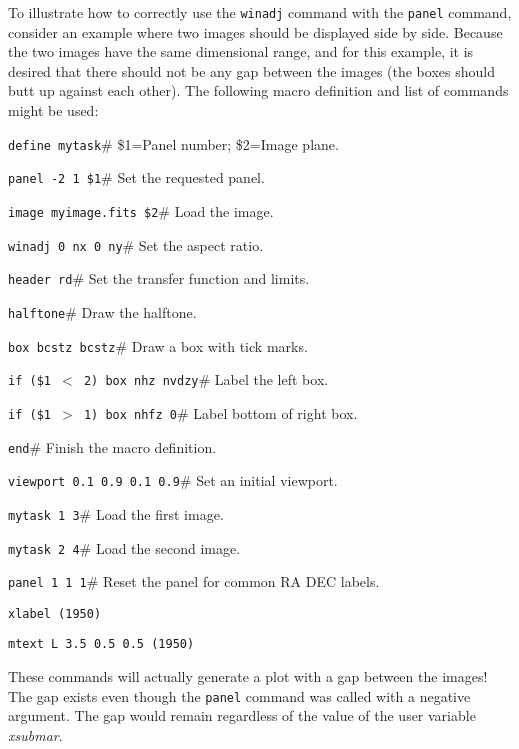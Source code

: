 To illustrate how to correctly use the {\tt winadj} command with the
{\tt panel} command,
consider an example where two images should be displayed side by side.
Because the two images have the same dimensional range,
and for this example, it is desired that
there should not be any gap between the images (\ie the boxes should
butt up against each other).
The following macro definition and list of commands might be used:
\begin{wiplist}%
  \item {\tt define mytask}\hfill \# \$1=Panel number; \$2=Image plane.
\samepage
  \item [\wipd] {\tt panel -2 1 \$1}\hfill \# Set the requested panel.
  \item [\wipd] {\tt image myimage.fits \$2}\hfill \# Load the image.
  \item [\wipd] {\tt winadj 0 nx 0 ny}\hfill \# Set the aspect ratio.
  \item [\wipd] {\tt header rd}\hfill \# Set the transfer function and limits.
  \item [\wipd] {\tt halftone}\hfill \# Draw the halftone.
  \item [\wipd] {\tt box bcstz bcstz}\hfill \# Draw a box with tick marks.
  \item [\wipd] {\tt if (\$1 $<$ 2) box nhz nvdzy}\hfill \# Label the left box.
  \item [\wipd] {\tt if (\$1 $>$ 1) box nhfz 0}\hfill \# Label bottom of right box.
  \item [\wipd] {\tt end}\hfill \# Finish the macro definition.
  \item {\tt viewport 0.1 0.9 0.1 0.9}\hfill \# Set an initial viewport.
  \item {\tt mytask 1 3}\hfill \# Load the first image.
  \item {\tt mytask 2 4}\hfill \# Load the second image.
  \item {\tt panel 1 1 1}\hfill \# Reset the panel for common RA DEC labels.
  \item {\tt xlabel  (1950)}
  \item {\tt mtext L 3.5 0.5 0.5  (1950)}
\end{wiplist}
These commands will actually
generate a plot with a gap between the images!
The gap exists even though
the {\tt panel}
command was called with a negative argument.
The gap would remain regardless of the value of
the user variable {\em xsubmar}.

